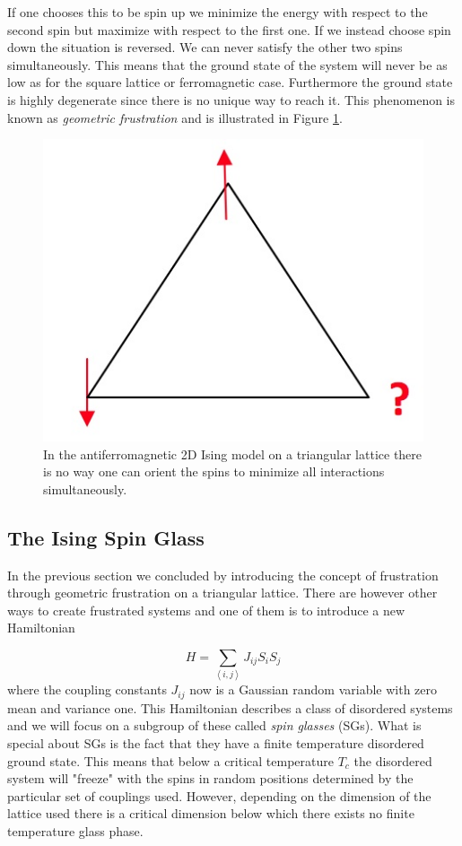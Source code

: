 \documentclass[paper=a4, fontsize=11pt]{scrartcl} %
\numberwithin{equation}{section} %
\numberwithin{figure}{section} %
\numberwithin{table}{section} %
\begin{document}
If one chooses this to be spin up we minimize the energy with respect to the second spin but maximize with respect to the first one. If we instead choose spin down the situation is reversed. We can never satisfy the other two spins simultaneously. This means that the ground state of the system will never be as low as for the square lattice or ferromagnetic case. Furthermore the ground state is highly degenerate since there is no unique way to reach it. This phenomenon is known as \emph{geometric frustration} and is illustrated in Figure \ref{fig:frustration}.

\begin{figure}
\centering
\includegraphics[scale=0.5]{images/frustration.jpg}
\caption{In the antiferromagnetic 2D Ising model on a triangular lattice there is no way one can orient the spins to minimize all interactions simultaneously.}
\label{fig:frustration}
\end{figure}

\subsection{The Ising Spin Glass}
In the previous section we concluded by introducing the concept of frustration through geometric frustration on a triangular lattice. There are however other ways to create frustrated systems and one of them is to introduce a new Hamiltonian

\begin{equation}
H=\sum\limits_{\left\langle i,j \right\rangle} J_{ij} S_{i} S_{j}
\end{equation}
where the coupling constants $J_{ij}$ now is a Gaussian random variable with zero mean and variance one. This Hamiltonian describes a class of disordered systems and we will focus on a subgroup of these called \emph{spin glasses} (SGs). What is special about SGs is the fact that they have a finite temperature disordered ground state. This means that below a critical temperature $T_c$ the disordered system will "freeze" with the spins in random positions determined by the particular set of couplings used. However, depending on the dimension of the lattice used there is a critical dimension below which there exists no finite temperature glass phase\cite{almeida}.
\end{document}
